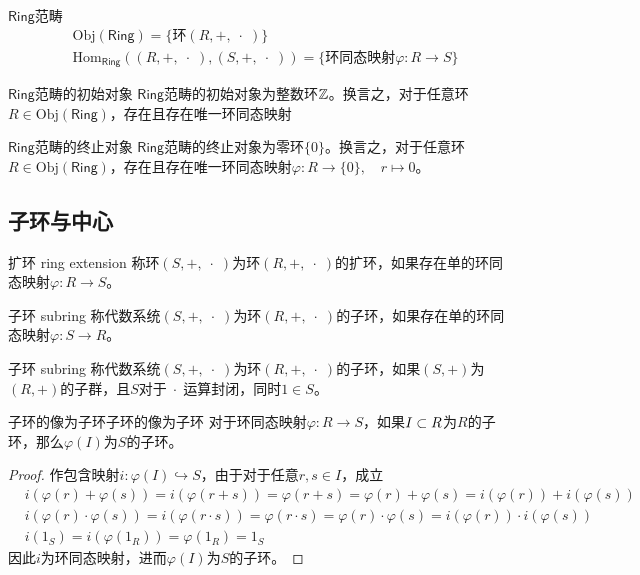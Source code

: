 \begin{definition}{$\mathsf{Ring}$范畴}
	\begin{align*}
		&\mathrm{Obj}(\mathsf{Ring})=\{ \text{环} (R,+,\;\cdot\;) \}\\
		&\mathrm{Hom}_\mathsf{Ring}((R,+,\;\cdot\;),(S,+,\;\cdot\;))=\{ \text{环同态映射}\varphi:R\to S\}
	\end{align*}
\end{definition}

\begin{proposition}{$\mathsf{Ring}$范畴的初始对象}
	$\mathsf{Ring}$范畴的初始对象为整数环$\mathbb{Z}$。换言之，对于任意环$R\in \mathrm{Obj}(\mathsf{Ring})$，存在且存在唯一环同态映射
\end{proposition}

\begin{proposition}{$\mathsf{Ring}$范畴的终止对象}
	$\mathsf{Ring}$范畴的终止对象为零环$\{0\}$。换言之，对于任意环$R\in \mathrm{Obj}(\mathsf{Ring})$，存在且存在唯一环同态映射$\varphi:R\to \{0\},\quad r\mapsto 0$。
\end{proposition}

\subsection{子环与中心}

\begin{definition}{扩环 ring extension}
	称环$(S,+,\;\cdot\;)$为环$(R,+,\;\cdot\;)$的扩环，如果存在单的环同态映射$\varphi:R\to S$。
\end{definition}

\begin{definition}{子环 subring}
	称代数系统$(S,+,\;\cdot\;)$为环$(R,+,\;\cdot\;)$的子环，如果存在单的环同态映射$\varphi:S\to R$。
\end{definition}

\begin{definition}{子环 subring}
	称代数系统$(S,+,\;\cdot\;)$为环$(R,+,\;\cdot\;)$的子环，如果$(S,+)$为$(R,+)$的子群，且$S$对于$\;\cdot\;$运算封闭，同时$1\in S$。
\end{definition}

\begin{proposition}{子环的像为子环}{子环的像为子环}
	对于环同态映射$\varphi:R\to S$，如果$I\subset R$为$R$的子环，那么$\varphi(I)$为$S$的子环。
\end{proposition}

\begin{proof}
	作包含映射$i:\varphi(I)\hookrightarrow S$，由于对于任意$r,s\in I$，成立
	\begin{align*}
		&i(\varphi(r)+\varphi(s))=i(\varphi(r+s))=\varphi(r+s)=\varphi(r)+\varphi(s)=i(\varphi(r))+i(\varphi(s))\\
		&i(\varphi(r)\cdot\varphi(s))=i(\varphi(r\cdot s))=\varphi(r\cdot s)=\varphi(r)\cdot \varphi(s)=i(\varphi(r))\cdot i(\varphi(s))\\
		&i(1_S)=i(\varphi(1_R))=\varphi(1_R)=1_S
	\end{align*}
	因此$i$为环同态映射，进而$\varphi(I)$为$S$的子环。
\end{proof}

